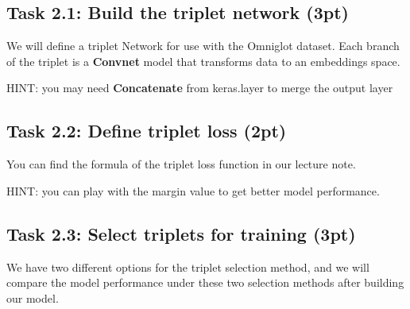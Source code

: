 \documentclass[a4paper,twoside,10pt]{article}
\begin{document}
	
	
	
	\subsection*{Task 2.1:  Build  the triplet network (3pt)}
	We will define a triplet Network for use with the Omniglot dataset. Each branch of the triplet is a \textbf{Convnet} model that transforms data to an embeddings space.
	
	HINT: you may need \textbf{Concatenate} from keras.layer to merge the output layer
	
	
	
	\subsection*{Task 2.2: Define triplet loss (2pt)}
	You can find the formula of the triplet loss function in our lecture note.  
	
	HINT: you can play with the margin value to get better model performance.
	
	
	\subsection*{Task 2.3: Select triplets for training (3pt)}
	We have two different options for the triplet selection method, and we will compare the model performance under these two selection methods after building our model.
	
\end{document}
